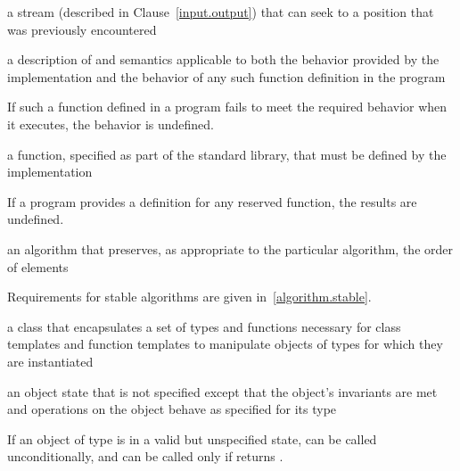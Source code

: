%
a stream (described in Clause~\ref{input.output}) that can seek to a position that was
previously encountered

%
a description of
and
semantics
applicable to both the behavior provided by the implementation and
the behavior of any such function definition in the program\\
\begin{note}
If such a function defined in a \Cpp program fails to meet the required
behavior when it executes, the behavior is undefined.%
\end{note}

%
a function, specified as part of the \Cpp standard library, that must be defined by the
implementation\\
\begin{note}
If a \Cpp program provides a definition for any reserved function, the results are undefined.%
\end{note}

%
%
an algorithm that preserves, as appropriate to the particular algorithm, the order
of elements\\
\begin{note} Requirements for stable algorithms are given in~\ref{algorithm.stable}. \end{note}

%
a class that encapsulates a set of types and functions necessary for class templates and
function templates to manipulate objects of types for which they are instantiated

%
an object state that is not specified except that the object's invariants are
met and operations on the object behave as specified for its type\\
\begin{example} If an object  of type  is in a
valid but unspecified state,  can be called unconditionally,
and  can be called only if  returns
. \end{example}

